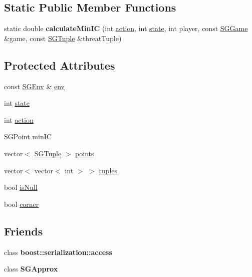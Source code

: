 \subsection*{Static Public Member Functions}
\begin{DoxyCompactItemize}
\item 
\hypertarget{classSGAction_a9d6073bab90739b098d8653d2eb51c6b}{static double {\bfseries calculate\-Min\-I\-C} (int \hyperlink{classSGAction_a65c62a3804b50febd9a289f3d8902f85}{action}, int \hyperlink{classSGAction_a1ad4ae3feb4e3ec46e21273dd51a6004}{state}, int player, const \hyperlink{classSGGame}{S\-G\-Game} \&game, const \hyperlink{classSGTuple}{S\-G\-Tuple} \&threat\-Tuple)}\label{classSGAction_a9d6073bab90739b098d8653d2eb51c6b}

\end{DoxyCompactItemize}
\subsection*{Protected Attributes}
\begin{DoxyCompactItemize}
\item 
const \hyperlink{classSGEnv}{S\-G\-Env} \& \hyperlink{classSGAction_a5ae60f6fd5a545d13c8a2525d7378b9d}{env}
\item 
int \hyperlink{classSGAction_a1ad4ae3feb4e3ec46e21273dd51a6004}{state}
\item 
int \hyperlink{classSGAction_a65c62a3804b50febd9a289f3d8902f85}{action}
\item 
\hyperlink{classSGPoint}{S\-G\-Point} \hyperlink{classSGAction_a20b96be3274e3cd2bc1be0d218fc2b06}{min\-I\-C}
\item 
vector$<$ \hyperlink{classSGTuple}{S\-G\-Tuple} $>$ \hyperlink{classSGAction_a8860ada2cacece1a8feed794d81d9e9f}{points}
\item 
vector$<$ vector$<$ int $>$ $>$ \hyperlink{classSGAction_a60599bc5a745db1557191a61c0db28b3}{tuples}
\item 
bool \hyperlink{classSGAction_a57b045c64bb537b920ce4065f214c5f6}{is\-Null}
\item 
bool \hyperlink{classSGAction_accae7581737b79cbe61c2b902a25d6cf}{corner}
\end{DoxyCompactItemize}
\subsection*{Friends}
\begin{DoxyCompactItemize}
\item 
\hypertarget{classSGAction_ac98d07dd8f7b70e16ccb9a01abf56b9c}{class {\bfseries boost\-::serialization\-::access}}\label{classSGAction_ac98d07dd8f7b70e16ccb9a01abf56b9c}

\item 
\hypertarget{classSGAction_a80adcf9eac5da53e729646c94d3b8f1d}{class {\bfseries S\-G\-Approx}}\label{classSGAction_a80adcf9eac5da53e729646c94d3b8f1d}

\end{DoxyCompactItemize}


